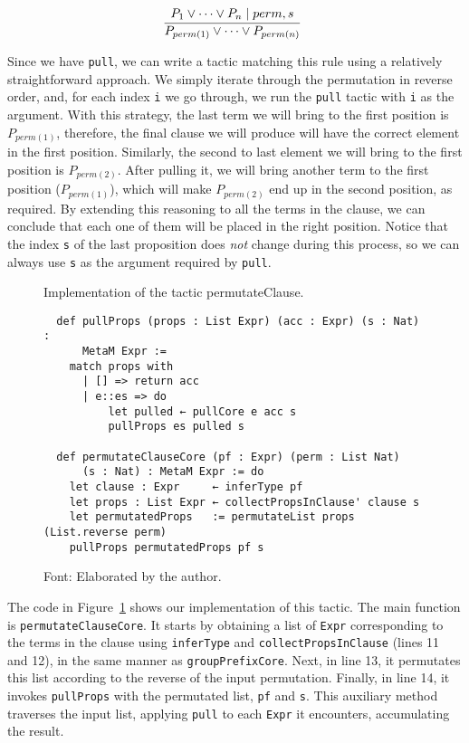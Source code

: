 \[
  \infer[]{P_{perm(1)} \vee \cdots \vee P_{perm(n)}}{P_{1} \vee \cdots \vee P_{n} \mid perm, s}
\]


Since we have \texttt{pull}, we can write a tactic matching
this rule using a relatively straightforward approach. We simply iterate through the permutation in
reverse order, and, for each index \texttt{i} we go through, we run the \texttt{pull} tactic
with \texttt{i} as the argument. With this strategy, the last term we will bring to the first position is
$P_{perm(1)}$, therefore, the final clause we will produce will have the correct element in the first position.
Similarly, the second to last element we will bring to the first
position is $P_{perm(2)}$. After pulling it, we will bring another term to the first position ($P_{perm(1)}$), which will make $P_{perm(2)}$
end up in the second position, as required. By extending this reasoning to all the terms in the clause,
we can conclude that each one of them will be placed in the right position. Notice that the index \texttt{s} of
the last proposition does \textit{not} change during this process, so we can always use \texttt{s} as the argument
required by \texttt{pull}.

\begin{figure}[t]
\caption{Implementation of the tactic permutateClause.}\label{permClauseImp}
\begin{verbatim}
  def pullProps (props : List Expr) (acc : Expr) (s : Nat) :
      MetaM Expr :=
    match props with
      | [] => return acc
      | e::es => do
          let pulled ← pullCore e acc s
          pullProps es pulled s

  def permutateClauseCore (pf : Expr) (perm : List Nat)
      (s : Nat) : MetaM Expr := do
    let clause : Expr     ← inferType pf
    let props : List Expr ← collectPropsInClause' clause s
    let permutatedProps   := permutateList props (List.reverse perm)
    pullProps permutatedProps pf s
\end{verbatim}
\caption*{Font: Elaborated by the author.}
\end{figure}

The code in Figure~\ref{permClauseImp} shows our implementation of this tactic.
The main function is \texttt{permutateClauseCore}. It starts by obtaining a list of
\texttt{Expr} corresponding to the terms in the clause using \texttt{inferType}
and \texttt{collectPropsInClause} (lines 11 and 12), in the same manner as
\texttt{groupPrefixCore}. Next, in line 13, it permutates this list according
to the reverse of the input permutation. Finally, in line 14, it invokes
\texttt{pullProps} with the permutated list, \texttt{pf} and \texttt{s}.
This auxiliary method traverses the input list, applying \texttt{pull} to
each \texttt{Expr} it encounters, accumulating the result.

